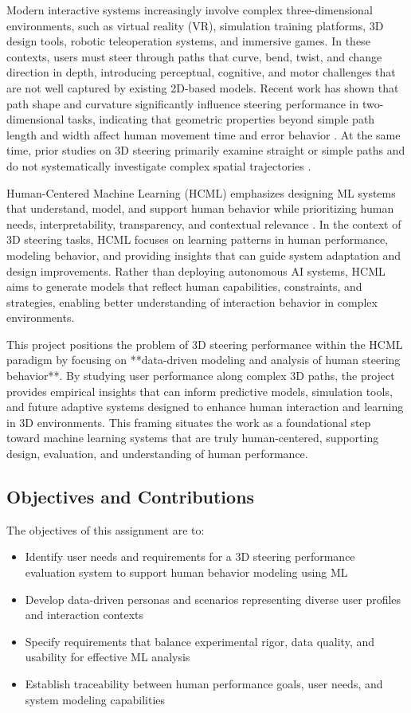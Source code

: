 \documentclass[sigconf]{acmart}
\begin{document}
Modern interactive systems increasingly involve complex three-dimensional environments, such as virtual reality (VR), simulation training platforms, 3D design tools, robotic teleoperation systems, and immersive games. In these contexts, users must steer through paths that curve, bend, twist, and change direction in depth, introducing perceptual, cognitive, and motor challenges that are not well captured by existing 2D-based models. Recent work has shown that path shape and curvature significantly influence steering performance in two-dimensional tasks, indicating that geometric properties beyond simple path length and width affect human movement time and error behavior \cite{chen2025curves}. At the same time, prior studies on 3D steering primarily examine straight or simple paths and do not systematically investigate complex spatial trajectories \cite{liu2011revisiting}.

Human-Centered Machine Learning (HCML) emphasizes designing ML systems that understand, model, and support human behavior while prioritizing human needs, interpretability, transparency, and contextual relevance \cite{shneiderman2022hcai}. In the context of 3D steering tasks, HCML focuses on learning patterns in human performance, modeling behavior, and providing insights that can guide system adaptation and design improvements. Rather than deploying autonomous AI systems, HCML aims to generate models that reflect human capabilities, constraints, and strategies, enabling better understanding of interaction behavior in complex environments.

This project positions the problem of 3D steering performance within the HCML paradigm by focusing on **data-driven modeling and analysis of human steering behavior**. By studying user performance along complex 3D paths, the project provides empirical insights that can inform predictive models, simulation tools, and future adaptive systems designed to enhance human interaction and learning in 3D environments. This framing situates the work as a foundational step toward machine learning systems that are truly human-centered, supporting design, evaluation, and understanding of human performance.

\subsection{Objectives and Contributions}

The objectives of this assignment are to:
\begin{itemize}
  \item Identify user needs and requirements for a 3D steering performance evaluation system to support human behavior modeling using ML
  \item Develop data-driven personas and scenarios representing diverse user profiles and interaction contexts
  \item Specify requirements that balance experimental rigor, data quality, and usability for effective ML analysis
  \item Establish traceability between human performance goals, user needs, and system modeling capabilities
\end{itemize}
\end{document}

